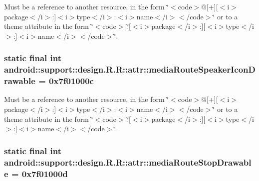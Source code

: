 Must be a reference to another resource, in the form \char`\"{}$<$code$>$@\mbox{[}+\mbox{]}\mbox{[}$<$i$>$package$<$/i$>$:\mbox{]}$<$i$>$type$<$/i$>$:$<$i$>$name$<$/i$>$$<$/code$>$\char`\"{} or to a theme attribute in the form \char`\"{}$<$code$>$?\mbox{[}$<$i$>$package$<$/i$>$:\mbox{]}\mbox{[}$<$i$>$type$<$/i$>$:\mbox{]}$<$i$>$name$<$/i$>$$<$/code$>$\char`\"{}. \hypertarget{classandroid_1_1support_1_1design_1_1_r_1_1attr_6cd8cc84eccb0c6650eb5a81b09f6c24}{
\subsubsection[{mediaRouteSpeakerIconDrawable}]{\setlength{\rightskip}{0pt plus 5cm}static final int android::support::design.R.R::attr::mediaRouteSpeakerIconDrawable = 0x7f01000c}}
\label{classandroid_1_1support_1_1design_1_1_r_1_1attr_6cd8cc84eccb0c6650eb5a81b09f6c24}


Must be a reference to another resource, in the form \char`\"{}$<$code$>$@\mbox{[}+\mbox{]}\mbox{[}$<$i$>$package$<$/i$>$:\mbox{]}$<$i$>$type$<$/i$>$:$<$i$>$name$<$/i$>$$<$/code$>$\char`\"{} or to a theme attribute in the form \char`\"{}$<$code$>$?\mbox{[}$<$i$>$package$<$/i$>$:\mbox{]}\mbox{[}$<$i$>$type$<$/i$>$:\mbox{]}$<$i$>$name$<$/i$>$$<$/code$>$\char`\"{}. \hypertarget{classandroid_1_1support_1_1design_1_1_r_1_1attr_9b2bd16b38a8627693abe67fbf04edf2}{
\subsubsection[{mediaRouteStopDrawable}]{\setlength{\rightskip}{0pt plus 5cm}static final int android::support::design.R.R::attr::mediaRouteStopDrawable = 0x7f01000d}}
\label{classandroid_1_1support_1_1design_1_1_r_1_1attr_9b2bd16b38a8627693abe67fbf04edf2}


